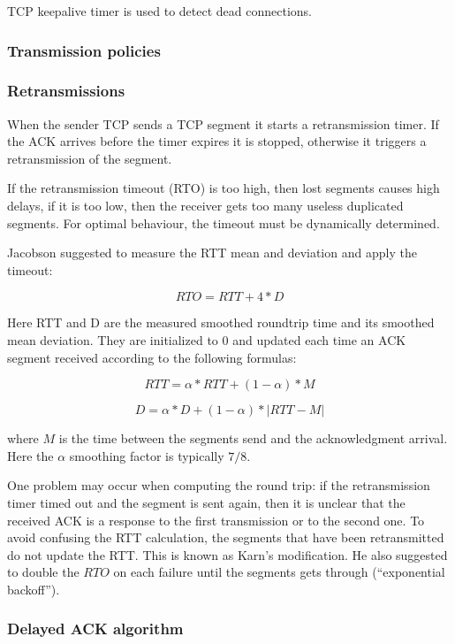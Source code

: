 TCP keepalive timer is used to detect dead connections.

\subsubsection{Transmission policies}
\label{subsec:trans_policies}

\subsubsection*{Retransmissions}


When the sender TCP sends a TCP segment it starts a
retransmission timer.
If the ACK arrives before the timer expires it is stopped,
otherwise it triggers a retransmission of the segment.

If the retransmission timeout (RTO) is too high, then lost segments
causes high delays, if it is too low, then the receiver gets
too many useless duplicated segments. For optimal behaviour, the
timeout must be dynamically determined.

Jacobson suggested to measure the RTT mean and deviation
and apply the timeout:

$$ RTO = RTT + 4 * D $$

Here RTT and D are the measured smoothed roundtrip time and its
smoothed mean deviation. They are initialized to 0 and updated each time an
ACK segment received according to the following formulas:

$$ RTT = \alpha*RTT + (1-\alpha) * M $$

$$ D = \alpha*D + (1-\alpha)*|RTT-M| $$

where $M$ is the time between the segments send and the acknowledgment
arrival. Here the $\alpha$ smoothing factor is typically $7/8$.

One problem may occur when computing the round trip: if the
retransmission timer timed out and the segment is sent again,
then it is unclear that the received ACK is a response to the
first transmission or to the second one. To avoid confusing the
RTT calculation, the segments that have been retransmitted
do not update the RTT. This is known as Karn's modification.
He also suggested to double the $RTO$ on each failure until the
segments gets through (``exponential backoff'').

\subsubsection*{Delayed ACK algorithm}

